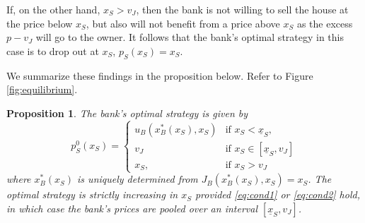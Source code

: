 \documentclass[11pt,twopage]{article}
\newcommand{\ul}{\underline}
\newtheorem{proposition}{Proposition}
{\bf}{\it}
\begin{document}
If, on the other hand, $x_S>v_J$, then the bank is not willing to sell
the house at the price below $x_S$, but also will not benefit from a
price above $x_S$ as the excess $p - v_J$ will go to the owner. It
follows that the bank's optimal strategy in this case is to drop out
at $x_S$, $p_S(x_S) = x_S$.

We summarize these findings in the proposition below. Refer to Figure
\ref{fig:equilibrium}.
\begin{proposition}\label{prop:syminfo}
  The bank's optimal strategy is given by
  \[ p_S^0(x_S) =
  \begin{cases}
    u_B(x_B^*(x_S),x_S) & \text{if $x_S<\ul x_S$,} \\
    v_J & \text{if $x_S\in[\ul x_S,v_J]$} \\
    x_S, & \text{if $x_S > v_J$}
  \end{cases}
  \]
where $x_B^*(x_S)$ is uniquely determined from $J_B(x_B^*(x_S),x_S) = x_S$.   
  The optimal strategy is strictly increasing in $x_S$ provided
  \eqref{eq:cond1} or \eqref{eq:cond2} hold, in which case the bank's
  prices are pooled over an interval $[\underline x_S, v_J]$.
\end{proposition}
\end{document}
